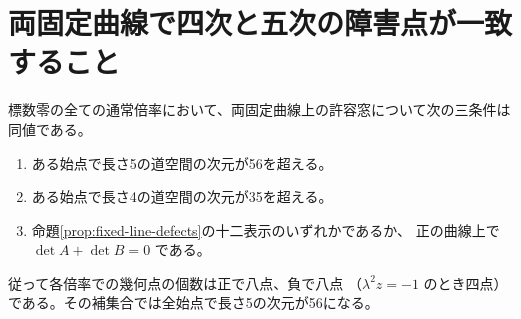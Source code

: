\section{両固定曲線で四次と五次の障害点が一致すること}
\label{sec:uniform-positive-quintics}
\begin{theorem}\label{thm:uniform-fixed-quintics}
標数零の全ての通常倍率において、両固定曲線上の許容窓について次の三条件は同値である。
\begin{enumerate}
\item ある始点で長さ5の道空間の次元が56を超える。
\item ある始点で長さ4の道空間の次元が35を超える。
\item 命題\ref{prop:fixed-line-defects}の十二表示のいずれかであるか、
正の曲線上で $\det A+\det B=0$ である。
\end{enumerate}
従って各倍率での幾何点の個数は正で八点、負で八点
（$\lambda^2z=-1$ のとき四点）である。その補集合では全始点で長さ5の次元が56になる。
\end{theorem}
